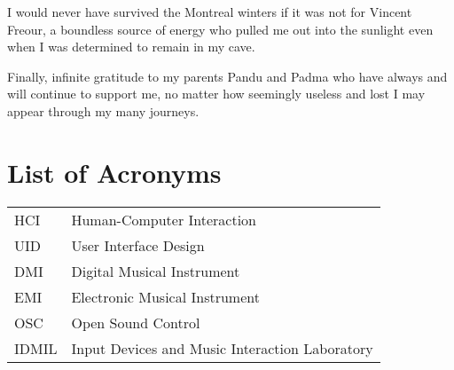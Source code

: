 \documentclass [12pt,letterpaper]{report}
\begin{document}
I would never have survived the Montreal winters if it was not for Vincent Freour, a boundless source of energy who pulled me out into the sunlight even when I was determined to remain in my cave.

Finally, infinite gratitude to my parents Pandu and Padma who have always and will continue to support me, no matter how seemingly useless and lost I may appear through my many journeys.

\tableofcontents
\listoffigures
\listoftables

\newpage
\chapter*{List of Acronyms}

\begin{longtable}{ll}
  HCI		&	Human-Computer Interaction\\
  UID		&	User Interface Design\\
  DMI		&	Digital Musical Instrument\\
  EMI		&	Electronic Musical Instrument\\
  OSC	&	Open Sound Control\\
  IDMIL	&	Input Devices and Music Interaction Laboratory\\
\end{longtable}

\cleardoublepage
{}

\typeout{}


\typeout{}


\typeout{}


\typeout{}


\typeout{}


\appendix



\begin{comment}
\typeout{}

\end{comment}

\typeout{}
\begin{singlespace}
  
  
\end{singlespace}
\end{document}

